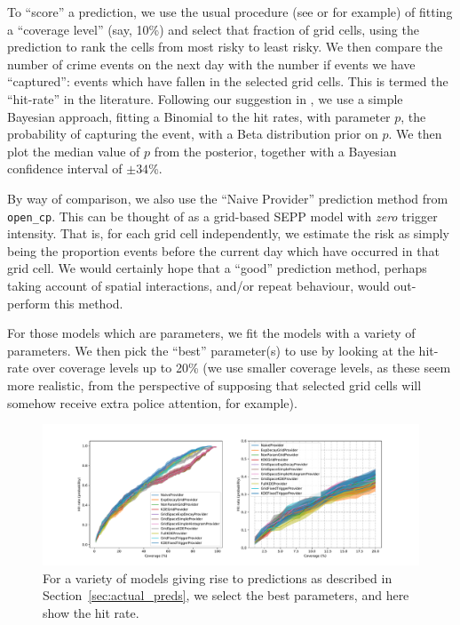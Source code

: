 \documentclass[twoside,a4paper]{article}
\theoremstyle{plain}
\theoremstyle{definition}
\begin{document}
To ``score'' a prediction, we use the usual procedure
(see \cite{arc} or \cite[Section~5]{sepp} for example)
 of fitting a ``coverage level'' (say, 10\%) and select that fraction
of grid cells, using the prediction to rank the cells from most risky to least risky.
We then compare the number of crime events on the next day with the number if events we
have ``captured'': events which have fallen in the selected grid cells.  This is termed the
``hit-rate'' in the literature.  Following our suggestion in \cite{daws2}, we use a simple
Bayesian approach, fitting a Binomial to the hit rates, with parameter $p$, the probability
of capturing the event, with a Beta distribution prior on $p$.  We then plot the median value of
$p$ from the posterior, together with a Bayesian confidence interval of $\pm 34$\%.

By way of comparison, we also use the ``Naive Provider'' prediction method from
\texttt{open\_cp}.  This can be thought of as a grid-based SEPP model with \emph{zero}
trigger intensity.  That is, for each grid cell independently, we estimate the risk as simply
being the proportion events before the current day which have occurred in that grid cell.
We would certainly hope that a ``good'' prediction method, perhaps taking account of spatial
interactions, and/or repeat behaviour, would out-perform this method.

For those models which are parameters, we fit the models with a variety of parameters.  
We then pick the ``best'' parameter(s) to use by looking at the hit-rate over coverage levels
up to 20\% (we use smaller coverage levels, as these seem more realistic, from the perspective
of supposing that selected grid cells will somehow receive extra police attention, for example).

\begin{figure}
  \includegraphics[width=\textwidth]{../notebooks/all_north_preds.pdf}
  \caption{For a variety of models giving rise to predictions as described in
  Section~\ref{sec:actual_preds}, we select the best parameters, and here show the hit rate.}
  \label{fig:north_preds}
\end{figure}
\end{document}
